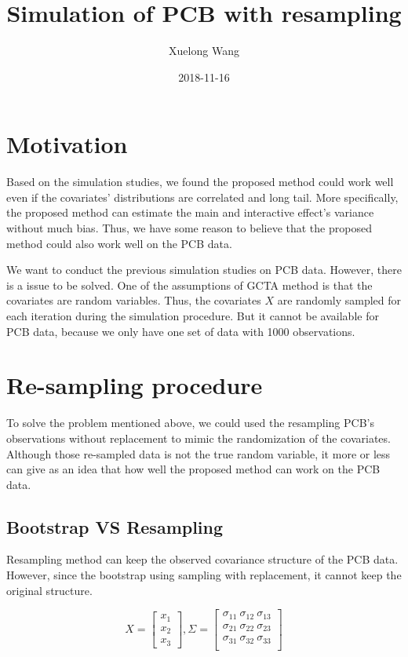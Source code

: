\documentclass[]{article}
\title{Simulation of PCB with resampling}
\author{Xuelong Wang}
\date{2018-11-16}
\begin{document}
\maketitle

{
\setcounter{tocdepth}{2}
\tableofcontents
}
\section{Motivation}\label{motivation}

Based on the simulation studies, we found the proposed method could work
well even if the covariates' distributions are correlated and long tail.
More specifically, the proposed method can estimate the main and
interactive effect's variance without much bias. Thus, we have some
reason to believe that the proposed method could also work well on the
PCB data.

We want to conduct the previous simulation studies on PCB data. However,
there is a issue to be solved. One of the assumptions of GCTA method is
that the covariates are random variables. Thus, the covariates \(X\) are
randomly sampled for each iteration during the simulation procedure. But
it cannot be available for PCB data, because we only have one set of
data with 1000 observations.

\section{Re-sampling procedure}\label{re-sampling-procedure}

To solve the problem mentioned above, we could used the resampling PCB's
observations without replacement to mimic the randomization of the
covariates. Although those re-sampled data is not the true random
variable, it more or less can give as an idea that how well the proposed
method can work on the PCB data.

\subsection{Bootstrap VS Resampling}\label{bootstrap-vs-resampling}

Resampling method can keep the observed covariance structure of the PCB
data. However, since the bootstrap using sampling with replacement, it
cannot keep the original structure.

\[
  X = \begin{bmatrix}   
        x_1\\
        x_2\\
        x_3
      \end{bmatrix},
  \Sigma = \begin{bmatrix}   
        \sigma_{11} ~ \sigma_{12} ~ \sigma_{13}\\
        \sigma_{21} ~ \sigma_{22} ~ \sigma_{23}\\
        \sigma_{31} ~ \sigma_{32} ~ \sigma_{33}\\
      \end{bmatrix}
\]
\end{document}
